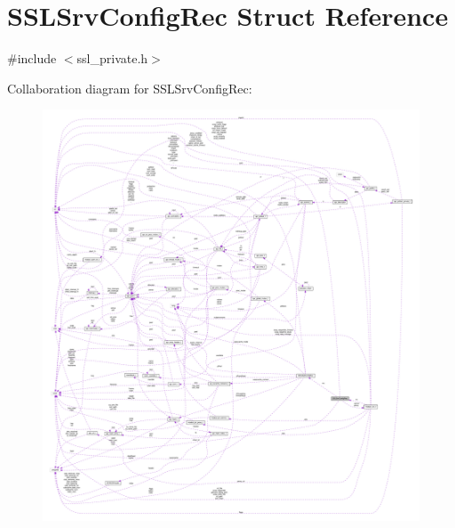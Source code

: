 \hypertarget{structSSLSrvConfigRec}{}\section{S\+S\+L\+Srv\+Config\+Rec Struct Reference}
\label{structSSLSrvConfigRec}


{\ttfamily \#include $<$ssl\+\_\+private.\+h$>$}



Collaboration diagram for S\+S\+L\+Srv\+Config\+Rec\+:
\nopagebreak
\begin{figure}[H]
\begin{center}
\leavevmode
\includegraphics[width=350pt]{structSSLSrvConfigRec__coll__graph}
\end{center}
\end{figure}
